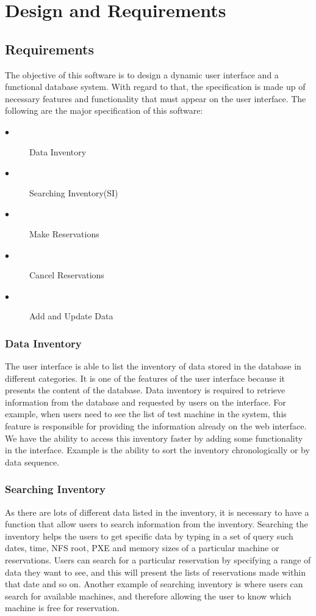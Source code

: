 \chapter{Design and Requirements}
\label{chap:figtab}
\label{chap}
\section{Requirements}
The objective of this software is to  design a dynamic user interface and a functional database system. With regard to that, the specification is made up of necessary features and functionality that must appear on the user interface. The following are the major specification of this software:
\begin{description}
\item[$\bullet$] Data Inventory
\item[$\bullet$] Searching Inventory(SI)
\item[$\bullet$] Make Reservations
\item[$\bullet$] Cancel Reservations
\item[$\bullet$] Add and Update Data
\end{description}
\subsection{Data Inventory}
The user interface is able to list the inventory of data stored in the database in different categories. It is one of the features of the user interface because it presents the content of the database. Data inventory is required to retrieve information from the database and requested by users on the interface. For example, when users need to see the list of test machine in the system, this feature is responsible for providing the information already on the web interface. We have the ability to access this inventory faster by adding some functionality in the interface. Example is the ability to sort the inventory chronologically or by data sequence. 
\subsection{Searching Inventory} \label{searchinventory}
As there are lots of different data listed in the inventory, it is necessary to have a function that allow users to search information from the inventory. Searching the inventory helps the users to get specific data by typing in a set of query such dates, time, NFS root, PXE and memory sizes of a particular machine or reservations. Users can search for a particular reservation by specifying a range of data they want to see, and this will present the lists of reservations made within that date and so on. Another example of searching inventory is where users can search for available machines, and therefore allowing the user to know which machine is free for reservation.

